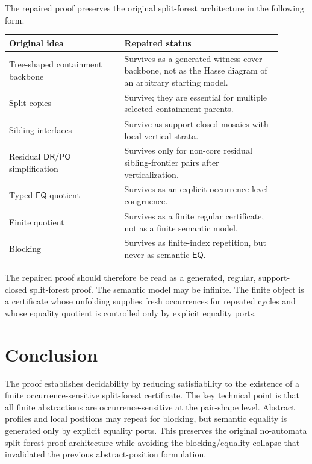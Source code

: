 \documentclass[11pt]{article}
\newcommand{\EQ}{\mathsf{EQ}}
\newcommand{\PO}{\mathsf{PO}}
\newcommand{\DR}{\mathsf{DR}}
\begin{document}
The repaired proof preserves the original split-forest architecture in the following form.
\begin{center}
\begin{tabular}{p{0.38\linewidth}p{0.52\linewidth}}
\toprule
Original idea & Repaired status \\
\midrule
Tree-shaped containment backbone & Survives as a generated witness-cover backbone, not as the Hasse diagram of an arbitrary starting model. \\
Split copies & Survive; they are essential for multiple selected containment parents. \\
Sibling interfaces & Survive as support-closed mosaics with local vertical strata. \\
Residual \(\DR/\PO\) simplification & Survives only for non-core residual sibling-frontier pairs after verticalization. \\
Typed \(\EQ\) quotient & Survives as an explicit occurrence-level congruence. \\
Finite quotient & Survives as a finite regular certificate, not as a finite semantic model. \\
Blocking & Survives as finite-index repetition, but never as semantic \(\EQ\). \\
\bottomrule
\end{tabular}
\end{center}

The repaired proof should therefore be read as a generated, regular, support-closed split-forest proof.  The semantic model may be infinite.  The finite object is a certificate whose unfolding supplies fresh occurrences for repeated cycles and whose equality quotient is controlled only by explicit equality ports.

\section{Conclusion}

The proof establishes decidability by reducing satisfiability to the existence of a finite occurrence-sensitive split-forest certificate.  The key technical point is that all finite abstractions are occurrence-sensitive at the pair-shape level.  Abstract profiles and local positions may repeat for blocking, but semantic equality is generated only by explicit equality ports.  This preserves the original no-automata split-forest proof architecture while avoiding the blocking/equality collapse that invalidated the previous abstract-position formulation.
\end{document}
